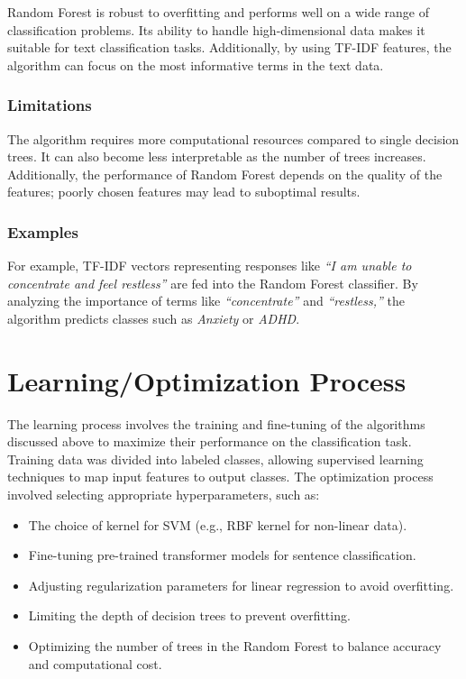 \documentclass[runningheads,a4paper,11pt]{report}
\begin{document}
Random Forest is robust to overfitting and performs well on a wide range of classification problems. Its ability to handle high-dimensional data makes it suitable for text classification tasks. Additionally, by using TF-IDF features, the algorithm can focus on the most informative terms in the text data.

\subsubsection{Limitations}
\label{subsubsection:random_forest_limitations}

The algorithm requires more computational resources compared to single decision trees. It can also become less interpretable as the number of trees increases. Additionally, the performance of Random Forest depends on the quality of the features; poorly chosen features may lead to suboptimal results.

\subsubsection{Examples}
\label{subsubsection:random_forest_examples}

For example, TF-IDF vectors representing responses like \textit{``I am unable to concentrate and feel restless''} are fed into the Random Forest classifier. By analyzing the importance of terms like \textit{``concentrate''} and \textit{``restless,''} the algorithm predicts classes such as \textit{Anxiety} or \textit{ADHD}.

\section{Learning/Optimization Process}
\label{section:learning_optimization}

The learning process involves the training and fine-tuning of the algorithms discussed above to maximize their performance on the classification task. Training data was divided into labeled classes, allowing supervised learning techniques to map input features to output classes. The optimization process involved selecting appropriate hyperparameters, such as:
\begin{itemize}
    \item The choice of kernel for SVM (e.g., RBF kernel for non-linear data).
    \item Fine-tuning pre-trained transformer models for sentence classification.
    \item Adjusting regularization parameters for linear regression to avoid overfitting.
    \item Limiting the depth of decision trees to prevent overfitting.
    \item Optimizing the number of trees in the Random Forest to balance accuracy and computational cost.
\end{itemize}
\end{document}
